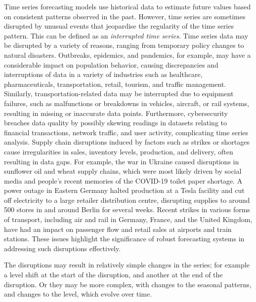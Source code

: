 \documentclass[
  11pt,
  a4paper,
]{article}
\begin{document}
Time series forecasting models use historical data to estimate future
values \autocite{fildes2008forecasting} based on consistent patterns
observed in the past. However, time series are sometimes disrupted by
unusual events that jeopardise the regularity of the time series
pattern. This can be defined as an \emph{interrupted time series}. Time
series data may be disrupted by a variety of reasons, ranging from
temporary policy changes to natural disasters. Outbreaks, epidemics, and
pandemics, for example, may have a considerable impact on population
behavior, causing discrepancies and interruptions of data in a variety
of industries such as healthcare, pharmaceuticals, transportation,
retail, tourism, and traffic management. Similarly,
transportation-related data may be interrupted due to equipment
failures, such as malfunctions or breakdowns in vehicles, aircraft, or
rail systems, resulting in missing or inaccurate data points.
Furthermore, cybersecurity breaches data quality by possibly skewing
readings in datasets relating to financial transactions, network
traffic, and user activity, complicating time series analysis. Supply
chain disruptions induced by factors such as strikes or shortages cause
irregularities in sales, inventory levels, production, and delivery,
often resulting in data gaps. For example, the war in Ukraine caused
disruptions in sunflower oil and wheat supply chains, which were most
likely driven by social media and people's recent memories of the
COVID-19 toilet paper shortage. A power outage in Eastern Germany halted
production at a Tesla facility and cut off electricity to a large
retailer distribution centre, disrupting supplies to around 500 stores
in and around Berlin for several weeks. Recent strikes in various forms
of transport, including air and rail in Germany, France, and the United
Kingdom, have had an impact on passenger flow and retail sales at
airports and train stations. These issues highlight the significance of
robust forecasting systems in addressing such disruptions effectively.

The disruptions may result in relatively simple changes in the series;
for example a level shift at the start of the disruption, and another at
the end of the disruption. Or they may be more complex, with changes to
the seasonal patterns, and changes to the level, which evolve over time.
\end{document}
